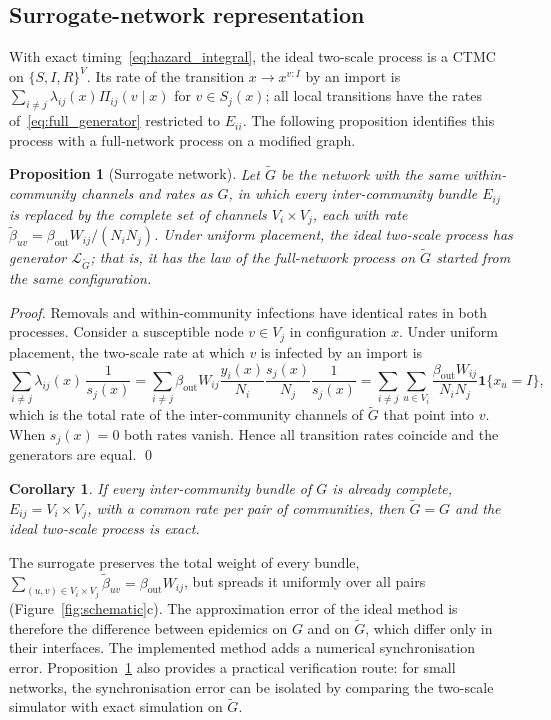 \documentclass[a4paper,fleqn]{cas-sc}
\newtheorem{proposition}{Proposition}
\newtheorem{corollary}{Corollary}
\newcommand{\ind}{\mathbf{1}}
\begin{document}
\subsection{Surrogate-network representation}
\label{sec:surrogate}

With exact timing~\eqref{eq:hazard_integral}, the ideal two-scale process is a CTMC on $\{S,I,R\}^V$. Its rate of the transition $x\to x^{v:I}$ by an import is $\sum_{i\neq j}\lambda_{ij}(x)\Pi_{ij}(v\mid x)$ for $v\in S_j(x)$; all local transitions have the rates of~\eqref{eq:full_generator} restricted to $E_{ii}$. The following proposition identifies this process with a full-network process on a modified graph.

\begin{proposition}[Surrogate network]
\label{prop:surrogate}
Let $\tilde G$ be the network with the same within-community channels and rates as $G$, in which every inter-community bundle $E_{ij}$ is replaced by the complete set of channels $V_i\times V_j$, each with rate $\tilde\beta_{uv}=\beta_{\mathrm{out}}W_{ij}/(N_iN_j)$. Under uniform placement, the ideal two-scale process has generator $\mathcal{L}_{\tilde G}$; that is, it has the law of the full-network process on $\tilde G$ started from the same configuration.
\end{proposition}

\begin{proof}
Removals and within-community infections have identical rates in both processes. Consider a susceptible node $v\in V_j$ in configuration $x$. Under uniform placement, the two-scale rate at which $v$ is infected by an import is
\[
\sum_{i\neq j}\lambda_{ij}(x)\,\frac{1}{s_j(x)}
=\sum_{i\neq j}\beta_{\mathrm{out}}W_{ij}\frac{y_i(x)}{N_i}\frac{s_j(x)}{N_j}\frac{1}{s_j(x)}
=\sum_{i\neq j}\sum_{u\in V_i}\frac{\beta_{\mathrm{out}}W_{ij}}{N_iN_j}\ind\{x_u=I\},
\]
which is the total rate of the inter-community channels of $\tilde G$ that point into $v$. When $s_j(x)=0$ both rates vanish. Hence all transition rates coincide and the generators are equal. \qed
\end{proof}

\begin{corollary}
\label{cor:exact}
If every inter-community bundle of $G$ is already complete, $E_{ij}=V_i\times V_j$, with a common rate per pair of communities, then $\tilde G=G$ and the ideal two-scale process is exact.
\end{corollary}

The surrogate preserves the total weight of every bundle, $\sum_{(u,v)\in V_i\times V_j}\tilde\beta_{uv}=\beta_{\mathrm{out}}W_{ij}$, but spreads it uniformly over all pairs (Figure~\ref{fig:schematic}c). The approximation error of the ideal method is therefore the difference between epidemics on $G$ and on $\tilde G$, which differ only in their interfaces. The implemented method adds a numerical synchronisation error. Proposition~\ref{prop:surrogate} also provides a practical verification route: for small networks, the synchronisation error can be isolated by comparing the two-scale simulator with exact simulation on $\tilde G$.
\end{document}
